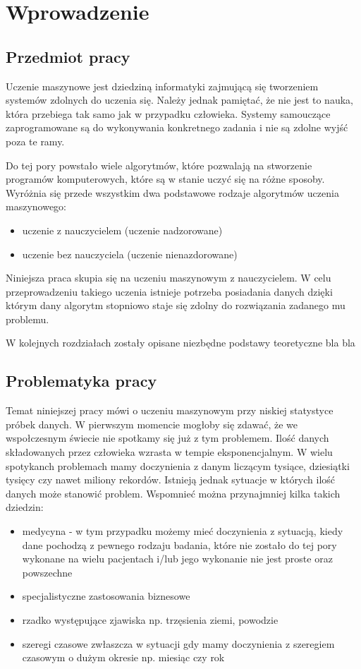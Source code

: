 \section{Wprowadzenie}
\subsection{Przedmiot pracy}
Uczenie maszynowe jest dziedziną informatyki zajmującą się tworzeniem systemów zdolnych do uczenia się. Należy jednak pamiętać,  że nie jest to nauka, która przebiega tak samo jak w przypadku człowieka. Systemy samouczące zaprogramowane są do wykonywania konkretnego zadania i nie są zdolne wyjść poza te ramy. 



 Do tej pory powstało wiele algorytmów, które pozwalają na stworzenie programów komputerowych, które są w stanie uczyć się na różne sposoby. Wyróżnia się przede wszystkim dwa podstawowe rodzaje algorytmów uczenia maszynowego:
\begin{itemize}
\item uczenie z nauczycielem (uczenie nadzorowane)
\item uczenie bez nauczyciela (uczenie nienazdorowane)
\end{itemize}
Niniejsza praca skupia się na uczeniu maszynowym z nauczycielem. W celu przeprowadzeniu takiego uczenia istnieje potrzeba posiadania danych dzięki którym dany algorytm stopniowo staje się zdolny do rozwiązania zadanego mu problemu.

W kolejnych rozdziałach zostały opisane niezbędne podstawy teoretyczne bla bla
\subsection{Problematyka pracy}
Temat niniejszej pracy mówi o uczeniu maszynowym przy niskiej statystyce próbek danych. W pierwszym momencie mogłoby się zdawać, że we wspołczesnym świecie nie spotkamy się już z tym problemem. Ilość danych składowanych przez człowieka wzrasta w tempie eksponencjalnym. W wielu spotykanch problemach mamy doczynienia z danym liczącym tysiące, dziesiątki tysięcy czy nawet miliony rekordów. Istnieją jednak sytuacje w których ilość danych może stanowić problem. Wspomnieć można przynajmniej kilka takich dziedzin:
\begin{itemize}
\item medycyna - w tym przypadku możemy mieć doczynienia z sytuacją, kiedy dane pochodzą z pewnego rodzaju badania, które nie zostało do tej pory wykonane na wielu pacjentach i/lub jego wykonanie nie jest proste oraz powszechne
\item specjalistyczne zastosowania biznesowe
\item rzadko występujące zjawiska np. trzęsienia ziemi, powodzie
\item szeregi czasowe  zwłaszcza w sytuacji gdy mamy doczynienia z szeregiem czasowym o dużym okresie np. miesiąc czy rok

\end{itemize}